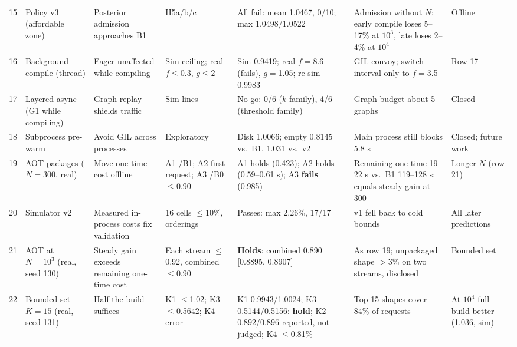 \documentclass[conference]{IEEEtran}
\newcommand{\tn}[1]{#1}%
\begin{document}
{\begin{longtable}{@{}P{0.4cm}P{2.2cm}P{2.6cm}P{2.6cm}P{3.3cm}P{3.2cm}P{2.2cm}@{}}
15 & Policy v3 (affordable zone) & Posterior admission approaches B1 & H5a/b/c & All fail: mean \tn{1.0467}, 0/10; max \tn{1.0498}/\tn{1.0522} & Admission without $N$: early compile loses \tn{5--17\%} at $10^3$, late loses \tn{2--4\%} at $10^4$ & Offline\\
16 & Background compile (thread) & Eager unaffected while compiling & Sim ceiling; real $f\le0.3$, $g\le2$ & Sim \tn{0.9419}; real $f{=}$\tn{8.6} (fails), $g{=}$\tn{1.05}; re-sim \tn{0.9983} & GIL convoy; switch interval only to $f{=}$\tn{3.5} & Row 17\\
17 & Layered async (G1 while compiling) & Graph replay shields traffic & Sim lines & No-go: 0/6 ($k$ family), 4/6 (threshold family) & Graph budget about 5 graphs & Closed\\
18 & Subprocess pre-warm & Avoid GIL across processes & Exploratory & Disk \tn{1.0066}; empty \tn{0.8145} vs.\ B1, \tn{1.031} vs.\ v2 & Main process still blocks \tn{5.8 s} & Closed; future work\\
19 & AOT packages ($N{=}300$, real) & Move one-time cost offline & A1 /B1; A2 first request; A3 /B0 $\le$0.90 & A1 holds (\tn{0.423}); A2 holds (\tn{0.59--0.61 s}); A3 \textbf{fails} (\tn{0.985}) & Remaining one-time \tn{19--22 s} vs.\ B1 \tn{119--128 s}; equals steady gain at 300 & Longer $N$ (row 21)\\
20 & Simulator v2 & Measured in-process costs fix validation & 16 cells $\le$10\%, orderings & Passes: max \tn{2.26\%}, 17/17 & v1 fell back to cold bounds & All later predictions\\
21 & AOT at $N{=}10^3$ (real, seed 130) & Steady gain exceeds remaining one-time cost & Each stream $\le$0.92, combined $\le$0.90 & \textbf{Holds}: combined \tn{0.890} [\tn{0.8895}, \tn{0.8907}] & As row 19; unpackaged shape $>$3\% on two streams, disclosed & Bounded set\\
22 & Bounded set $K{=}15$ (real, seed 131) & Half the build suffices & K1 $\le$1.02; K3 $\le$0.5642; K4 error & K1 \tn{0.9943}/\tn{1.0024}; K3 \tn{0.5144}/\tn{0.5156}: \textbf{hold}; K2 \tn{0.892}/\tn{0.896} reported, not judged; K4 $\le$\tn{0.81\%} & Top 15 shapes cover \tn{84\%} of requests & At $10^4$ full build better (\tn{1.036}, sim)\\

\end{longtable}}
\end{document}
